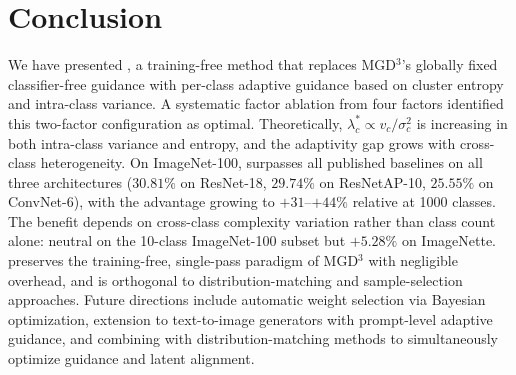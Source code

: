 \section{Conclusion}
\label{sec:conclusion}

We have presented \cags{}, a training-free method that replaces MGD$^3$'s globally fixed classifier-free guidance with per-class adaptive guidance based on cluster entropy and intra-class variance. A systematic factor ablation from four factors identified this two-factor configuration as optimal. Theoretically, $\lambda_c^* \propto v_c / \sigma_c^2$ is increasing in both intra-class variance and entropy, and the adaptivity gap grows with cross-class heterogeneity. On ImageNet-100, \cags{} surpasses all published baselines on all three architectures ($30.81\%$ on ResNet-18, $29.74\%$ on ResNetAP-10, $25.55\%$ on ConvNet-6), with the advantage growing to $+31$--$+44\%$ relative at 1000 classes. The benefit depends on cross-class complexity variation rather than class count alone: neutral on the 10-class ImageNet-100 subset but $+5.28\%$ on ImageNette. \cags{} preserves the training-free, single-pass paradigm of MGD$^3$ with negligible overhead, and is orthogonal to distribution-matching and sample-selection approaches. Future directions include automatic weight selection via Bayesian optimization, extension to text-to-image generators with prompt-level adaptive guidance, and combining \cags{} with distribution-matching methods to simultaneously optimize guidance and latent alignment.
